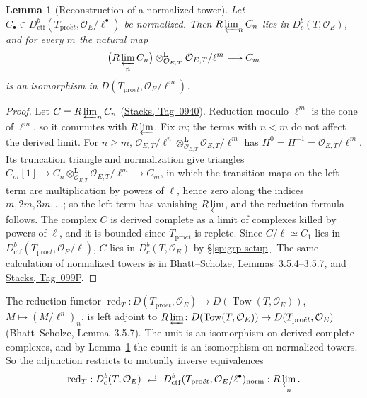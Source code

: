\documentclass[11pt,a4paper]{article}
\numberwithin{equation}{section}
\newtheorem{lemma}[theorem]{Lemma}
\theoremstyle{definition}
\theoremstyle{remark}
\newcommand{\Dbc}{D^b_c}
\newcommand{\proet}{\mathrm{pro}\acute{e}t}
\newcommand{\stacks}[1]{\href{https://stacks.math.columbia.edu/tag/#1}{\textnormal{Stacks, Tag~#1}}}
\newcommand{\Dctf}{D^b_{\mathrm{ctf}}}
\begin{document}
\begin{lemma}[Reconstruction of a normalized tower]
\label{lem:sp-tower}
Let $C_\bullet\in\Dctf(T_{\proet},\mathcal O_E/\ell^\bullet)$ be
normalized. Then $R\varprojlim_n C_n$ lies in
$\Dbc(T,\mathcal O_E)$, and for every $m$ the natural map
\[
 \bigl(R\varprojlim_n C_n\bigr)\otimes^{\mathbf L}_{\mathcal O_{E,T}}
 \mathcal O_{E,T}/\ell^m\longrightarrow C_m
\]
is an isomorphism in $D(T_{\proet},\mathcal O_E/\ell^m)$.
\end{lemma}
\begin{proof}
Let $C=R\varprojlim_nC_n$ (\stacks{0940}). Reduction modulo $\ell^m$ is
the cone of $\ell^m$, so it commutes with $R\varprojlim$. Fix $m$; the
terms with $n<m$ do not affect the derived limit. For $n\geq m$,
$\mathcal O_{E,T}/\ell^n\otimes^{\mathbf L}_{\mathcal O_{E,T}}
\mathcal O_{E,T}/\ell^m$ has $H^0=H^{-1}=\mathcal O_{E,T}/\ell^m$.
Its truncation triangle and normalization give triangles
$C_m[1]\to C_n\otimes^{\mathbf L}_{\mathcal O_{E,T}}\mathcal O_{E,T}/\ell^m\to C_m$,
in which the transition maps on the left term are multiplication by
powers of $\ell$, hence zero along the indices $m,2m,3m,\dots$; so the
left term has vanishing $R\varprojlim$, and the reduction formula
follows. The complex $C$ is derived complete as a limit of complexes
killed by powers of $\ell$, and it is bounded since $T_{\proet}$ is
replete. Since $C/\ell\simeq C_1$ lies in
$\Dctf(T_{\proet},\mathcal O_E/\ell)$, $C$ lies in $\Dbc(T,\mathcal O_E)$
by \S\ref{sp:grp-setup}. The same calculation of normalized towers is
in Bhatt--Scholze, Lemmas~3.5.4--3.5.7, and \stacks{099P}.
\end{proof}

The reduction functor
$\operatorname{red}_T:D(T_{\proet},\mathcal O_E)\to
D(\operatorname{Tow}(T,\mathcal O_E))$, $M\mapsto(M/\ell^n)_n$, is
left adjoint to
$R\varprojlim\colon D(\operatorname{Tow}(T,\mathcal O_E))\to
D(T_{\proet},\mathcal O_E)$ (Bhatt--Scholze, Lemma~3.5.7). The unit
is an isomorphism on derived complete complexes, and by
Lemma~\ref{lem:sp-tower} the counit is an isomorphism on normalized
towers. So the adjunction restricts to mutually inverse equivalences
\begin{equation}\label{eq:sp-normalized-equivalence}
 \operatorname{red}_T:\Dbc(T,\mathcal O_E)
       \ \rightleftarrows\
       \Dctf(T_{\proet},\mathcal O_E/\ell^\bullet)_{\mathrm{norm}}
       :R\varprojlim_n .
\end{equation}
\end{document}
